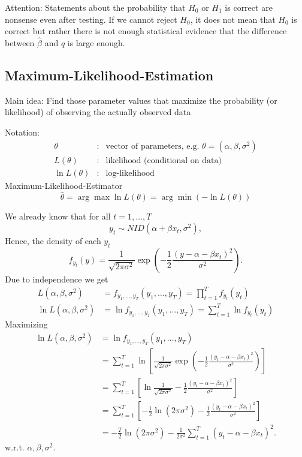 \documentclass{article}
\begin{document}
Attention: Statements about the probability that $H_0$ or $H_1$ is correct are nonsense even after testing. If we cannot reject $H_0$, it does not mean that $H_0$ is correct but rather there is not enough statistical evidence that the difference between $\hat{\beta}$ and $q$ is large enough.


\subsection*{Maximum-Likelihood-Estimation}

Main idea: Find those parameter values that maximize the probability
(or likelihood) of observing the actually observed data

Notation:
\begin{eqnarray*}
\theta &:&\text{vector of parameters, e.g. }\theta =(\alpha ,\beta ,\sigma^2)\\
L(\theta ) &:&\text{likelihood (conditional on data)} \\
\ln L\left( \theta \right) &:&\text{log-likelihood}
\end{eqnarray*}
Maximum-Likelihood-Estimator
\[ \hat{\theta}=\arg \max \ln L(\theta )=\arg \min (-\ln L(\theta )) \]

We already know that for all $t=1,\ldots ,T$
\[ y_{t}\sim NID(\alpha +\beta x_{t},\sigma ^{2}), \]
Hence, the density of each $y_{t}$
\[ f_{y_{t}}(y)=\frac{1}{\sqrt{2\pi \sigma ^{2}}}\exp \left( -\frac{1}{2}
\frac{\left( y-\alpha -\beta x_{t}\right) ^{2}}{\sigma ^{2}}\right). \]
Due to independence we get
\begin{align*}
L(\alpha ,\beta ,\sigma^2) &= f_{y_1,\ldots ,y_T}(y_1,\ldots,y_T)=\prod_{t=1}^{T}f_{y_t}(y_t) \\
\ln L(\alpha ,\beta ,\sigma^2) &= \ln f_{y_1,\ldots,y_T}(y_1,\ldots ,y_T)=\sum_{t=1}^T\ln f_{y_t}(y_t)
\end{align*}
Maximizing
\begin{align*}
\ln L(\alpha ,\beta ,\sigma ^{2}) &= \ln f_{y_{1},\ldots,y_{T}}(y_{1},\ldots ,y_{T}) \\
&=\sum_{t=1}^{T}\ln \left[ \frac{1}{\sqrt{2\pi \sigma^2}}\exp \left(-\frac{1}{2}\frac{(y_t-\alpha -\beta x_t)^2}{\sigma^2}\right) \right]\\
&=\sum_{t=1}^{T}\left[ \ln \frac{1}{\sqrt{2\pi \sigma ^{2}}}-\frac{1}{2}\frac{\left( y_{t}-\alpha -\beta x_{t}\right) ^{2}}{\sigma ^{2}}\right] \\
&=\sum_{t=1}^{T}\left[ -\frac{1}{2}\ln \left( 2\pi \sigma ^{2}\right) -\frac{1}{2}\frac{\left( y_{t}-\alpha -\beta x_{t}\right) ^{2}}{\sigma ^{2}}\right] \\
&=-\frac{T}{2}\ln \left( 2\pi \sigma ^{2}\right) -\frac{1}{2\sigma ^{2}}\sum_{t=1}^{T}\left( y_{t}-\alpha -\beta x_{t}\right) ^{2}.
\end{align*}
w.r.t. $\alpha ,\beta ,\sigma ^{2}$.
\end{document}
